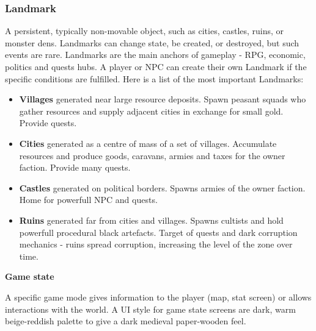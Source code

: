 \documentclass[a4paper,12pt]{article}
\begin{document}
\subsubsection{Landmark} 

A persistent, typically non-movable object, such as cities, castles, ruins, or monster dens. Landmarks can change state, be created, or destroyed, but such events are rare. Landmarks are the main anchors of gameplay - RPG, economic, politics and quests hubs. A player or NPC can create their own Landmark if the specific conditions are fulfilled. Here is a list of the most important Landmarks:

\begin{itemize}

\item \textbf{Villages} generated near large resource deposits. Spawn peasant squads who gather resources and supply adjacent cities in exchange for small gold. Provide quests.

\item \textbf{Cities} generated as a centre of mass of a set of villages. Accumulate resources and produce goods, caravans, armies and taxes for the owner faction. Provide many quests.

\item \textbf{Castles} generated on political borders. Spawns armies of the owner faction. Home for powerfull NPC and quests.

\item \textbf{Ruins} generated far from cities and villages. Spawns cultists and hold powerfull procedural black artefacts. Target of quests and dark corruption mechanics - ruins spread corruption, increasing the level of the zone over time.

\end{itemize}

\textbf{Game state}

 A specific game mode gives information to the player (map, stat screen) or allows interactions with the world. A UI style for game state screens are dark, warm beige-reddish palette to give a dark medieval paper-wooden feel.
 
\end{document}
